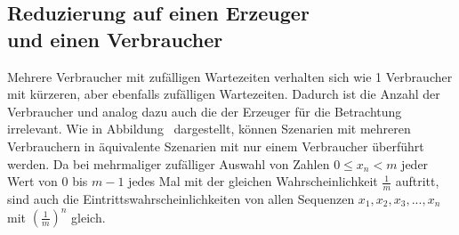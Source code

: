 
\subsection{Reduzierung auf einen Erzeuger \\und einen Verbraucher} %
\label{sub:reduzierung_auf_einen_erzeuger_und_einen_verbraucher}

Mehrere Verbraucher mit zufälligen Wartezeiten verhalten sich wie 1 Verbraucher mit kürzeren, aber ebenfalls zufälligen Wartezeiten. Dadurch ist die Anzahl der Verbraucher und analog dazu auch die der Erzeuger für die Betrachtung irrelevant. Wie in Abbildung~ dargestellt, können Szenarien mit mehreren Verbrauchern in äquivalente Szenarien mit nur einem Verbraucher überführt werden. Da bei mehrmaliger zufälliger Auswahl von Zahlen $0 \le { x }_{ n } < m$ jeder Wert von $0$ bis $m-1$ jedes Mal mit der gleichen Wahrscheinlichkeit $\frac { 1 }{ m } $ auftritt, sind auch die Eintrittswahrscheinlichkeiten von allen Sequenzen ${ x }_{ 1 }, { x }_{ 2 }, { x }_{ 3 }, ..., { x }_{ n }$ mit ${\left( \frac { 1 }{ m }  \right)}^{n}$ gleich.


